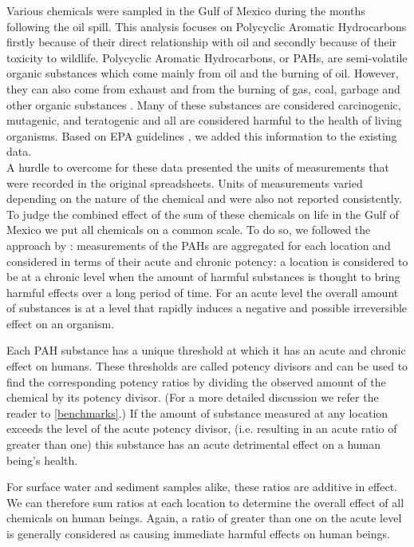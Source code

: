 \documentclass[authoryear,12pt]{elsarticle}
\begin{document}
Various chemicals were sampled in the Gulf of Mexico during the months following the oil spill. This analysis focuses on Polycyclic Aromatic Hydrocarbons firstly because of their direct relationship with oil and secondly because of their toxicity to wildlife. Polycyclic Aromatic Hydrocarbons, or PAHs, are semi-volatile organic substances which come mainly from oil and the burning of oil. However, they can also come from exhaust and from the burning of gas, coal, garbage and other organic substances \citep{pah}.   Many of these substances are considered carcinogenic, mutagenic, and teratogenic and all are considered harmful to the health of living organisms. Based on EPA guidelines \citep{pah},  {we added} this information to the  {existing} data. \\
{A hurdle to overcome for these data presented the units of measurements that were recorded in the original spreadsheets. Units of measurements varied depending on the nature of the chemical and were also not reported consistently. To judge the combined effect of the sum of these chemicals on life in the Gulf of Mexico we put all chemicals on a common scale.}
 {To do so,} we followed the approach by \citet{pah-benchmark}: measurements of the PAHs are aggregated for each location and considered in terms of their acute and chronic potency: a location is considered to be  at a chronic level when the amount of harmful substances is thought to bring harmful effects over a long period of time. For an acute level the overall amount of substances is at a level that rapidly induces a negative and possible irreversible effect  {on} an organism. 
 
Each PAH substance has a unique threshold at which it has an acute  {and} chronic effect on humans. These thresholds are called potency divisors  {and can be used} to find  {the} corresponding potency ratios by dividing the observed amount {of the chemical} by its  {potency} divisor. (For a more detailed discussion  {we refer the reader to}  \ref{benchmarks}.) {If the amount of substance measured at any location exceeds the level of the acute potency divisor, (i.e. resulting in an acute ratio of greater than one) this substance has an acute detrimental effect on a human being's health.} %

For surface water and sediment samples alike, these ratios are additive in effect. We can therefore sum ratios at each location to determine the overall effect of all chemicals on human beings. {Again}, a ratio of greater than  {one} on the acute level  {is generally} considered as causing immediate harmful effects on human beings.
\end{document}
